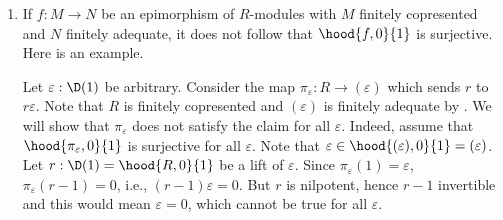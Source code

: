 \begin{enumerate}
      \item
      \begin{remark}\label{rem:hood-module-prs-surj}
        If $f : M \rightarrow N$ be an epimorphism of $R$-modules with $M$ finitely copresented
        and $N$ finitely adequate,
        it does not follow that $\hood{f,0}{1}$ is surjective.
        Here is an example.

        Let $\varepsilon : \D(1)$ be arbitrary.
        Consider the map $\pi_\varepsilon : R \to (\varepsilon)$ which sends $r$ to $r \varepsilon$.
        Note that $R$ is finitely copresented and $(\varepsilon)$ is finitely adequate
        by .
        We will show that $\pi_\varepsilon$ does not satisfy the claim for all $\varepsilon$.
        Indeed, assume that $\hood{\pi_{\varepsilon}, 0}{1}$ is surjective for all $\varepsilon$.
        Note that $\varepsilon \in \hood{(\varepsilon), 0}{1} = (\varepsilon)$.
        Let $r:\D(1) = \hood{R,0}{1}$ be a lift of $\varepsilon$.
        Since $\pi_\varepsilon(1) = \varepsilon$, $\pi_\varepsilon(r-1)=0$, i.e., $(r-1)\varepsilon=0$.
        But $r$ is nilpotent, hence $r-1$ invertible and this would mean $\varepsilon = 0$, which cannot be true for all $\varepsilon$.
      \end{remark}
\end{enumerate}
